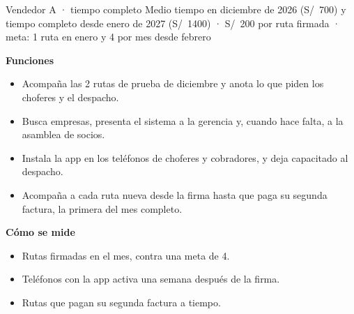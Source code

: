 \documentclass[10.5pt,a4paper]{article}
\begin{document}
\begin{rol}{Vendedor A · tiempo completo}
{\small\color{tenue}Medio tiempo en diciembre de 2026 (S/~700) y tiempo completo desde enero de 2027 (S/~1400) · S/~200 por ruta firmada · meta: 1 ruta en enero y 4 por mes desde febrero}\par\vspace{3pt}
\begin{minipage}[t]{0.52\linewidth}\small\textbf{\color{marca}Funciones}
\begin{itemize}
\item Acompaña las 2 rutas de prueba de diciembre y anota lo que piden los choferes y el despacho.
\item Busca empresas, presenta el sistema a la gerencia y, cuando hace falta, a la asamblea de socios.
\item Instala la app en los teléfonos de choferes y cobradores, y deja capacitado al despacho.
\item Acompaña a cada ruta nueva desde la firma hasta que paga su segunda factura, la primera del mes completo.
\end{itemize}\end{minipage}\hfill
\begin{minipage}[t]{0.44\linewidth}\small\textbf{\color{marca}Cómo se mide}
\begin{itemize}
\item Rutas firmadas en el mes, contra una meta de 4.
\item Teléfonos con la app activa una semana después de la firma.
\item Rutas que pagan su segunda factura a tiempo.
\end{itemize}\end{minipage}
\end{rol}
\end{document}
